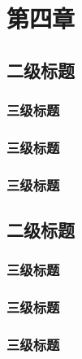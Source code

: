 \chapter{第四章} \label{cht:boundary_loss}

\section{二级标题}

\subsection{三级标题}

\subsection{三级标题}

\subsection{三级标题}

\section{二级标题}

\subsection{三级标题}

\subsection{三级标题}

\subsection{三级标题}